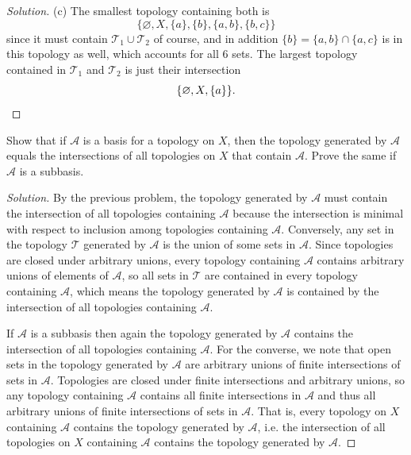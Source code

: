 \documentclass[11pt]{scrartcl}
\newenvironment{soln}{\begin{proof}[Solution]}{\end{proof}}
\begin{document}
\begin{soln}
    (c) The smallest topology containing both is
    \begin{equation*}
	\{\varnothing, X, \{a\}, \{b\},
	\{a,b\}, \{b,c\}\}
    \end{equation*}
    since it must contain $\mathcal T_1\cup\mathcal T_2$ of course,
    and in addition $\{b\} = \{a,b\}\cap\{a,c\}$ is in this topology as well,
    which accounts for all $6$ sets.
    The largest topology contained in $\mathcal T_1$ and $\mathcal T_2$
    is just their intersection
    \begin{equation*}
	\{\varnothing, X, \{a\}\}.\qedhere
    \end{equation*}
\end{soln}

\begin{problem*}
    [Munkres 13.5]
    Show that if $\mathcal A$ is a basis for a topology on $X$,
    then the topology generated by $\mathcal A$ equals
    the intersections of all topologies on $X$ that contain $\mathcal A$.
    Prove the same if $\mathcal A$ is a subbasis.
\end{problem*}

\begin{soln}
    By the previous problem, the topology generated by $\mathcal A$
    must contain the intersection of all topologies containing $\mathcal A$
    because the intersection is minimal with respect to inclusion
    among topologies containing $\mathcal A$.
    Conversely, any set in the topology $\mathcal T$ generated by $\mathcal A$
    is the union of some sets in $\mathcal A$. Since topologies
    are closed under arbitrary unions, every topology containing $\mathcal A$
    contains arbitrary unions of elements of $\mathcal A$,
    so all sets in $\mathcal T$ are contained in
    every topology containing $\mathcal A$,
    which means the topology generated by $\mathcal A$ is contained by
    the intersection of all topologies containing $\mathcal A$.

    If $\mathcal A$ is a subbasis then again the topology generated by $\mathcal A$
    contains the intersection of all topologies containing $\mathcal A$.
    For the converse, we note that open sets in the topology
    generated by $\mathcal A$ are arbitrary unions of finite intersections
    of sets in $\mathcal A$. Topologies are closed under finite intersections
    and arbitrary unions, so any topology containing $\mathcal A$
    contains all finite intersections in $\mathcal A$
    and thus all arbitrary unions of finite intersections of sets in $\mathcal A$.
    That is, every topology on $X$ containing $\mathcal A$
    contains the topology generated by $\mathcal A$,
    i.e. the intersection of all topologies on $X$ containing $\mathcal A$
    contains the topology generated by $\mathcal A$.
\end{soln}
\end{document}
